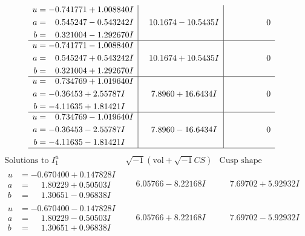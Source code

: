 \documentclass[1p]{elsarticle_modified}
\theoremstyle{definition}
\newcommand{\I}{\sqrt{-1}}
\begin{document}
$$\begin{array}{c|c|c}
\begin{aligned}
u &= -0.741771 + 1.008840 I \\
a &= \phantom{-}0.545247 - 0.543242 I \\
b &= \phantom{-}0.321004 - 1.292670 I\end{aligned}
 & \phantom{-}10.1674 - 10.5435 I & \phantom{-0.000000 } 0 \\ \hline\begin{aligned}
u &= -0.741771 - 1.008840 I \\
a &= \phantom{-}0.545247 + 0.543242 I \\
b &= \phantom{-}0.321004 + 1.292670 I\end{aligned}
 & \phantom{-}10.1674 + 10.5435 I & \phantom{-0.000000 } 0 \\ \hline\begin{aligned}
u &= \phantom{-}0.734769 + 1.019640 I \\
a &= -0.36453 + 2.55787 I \\
b &= -4.11635 + 1.81421 I\end{aligned}
 & \phantom{-}7.8960 + 16.6434 I & \phantom{-0.000000 } 0 \\ \hline\begin{aligned}
u &= \phantom{-}0.734769 - 1.019640 I \\
a &= -0.36453 - 2.55787 I \\
b &= -4.11635 - 1.81421 I\end{aligned}
 & \phantom{-}7.8960 - 16.6434 I & \phantom{-0.000000 } 0\\
 \hline 
 \end{array}$$\newpage$$\begin{array}{c|c|c}  
\text{Solutions to }I^u_{1}& \I (\text{vol} + \sqrt{-1}CS) & \text{Cusp shape}\\
 \hline 
\begin{aligned}
u &= -0.670400 + 0.147828 I \\
a &= \phantom{-}1.80229 + 0.50503 I \\
b &= \phantom{-}1.30651 - 0.96838 I\end{aligned}
 & \phantom{-}6.05766 - 8.22168 I & \phantom{-}7.69702 + 5.92932 I \\ \hline\begin{aligned}
u &= -0.670400 - 0.147828 I \\
a &= \phantom{-}1.80229 - 0.50503 I \\
b &= \phantom{-}1.30651 + 0.96838 I\end{aligned}
 & \phantom{-}6.05766 + 8.22168 I & \phantom{-}7.69702 - 5.92932 I \\ \hline\begin{aligned}

\end{aligned}
\end{array}$$
\end{document}
